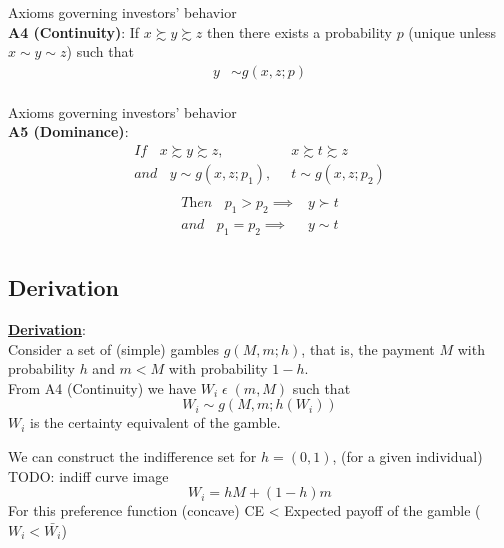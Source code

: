 \documentclass[
14pt,notheorems,hyperref={pdfauthor=whatever}
]{beamer}
\begin{document}
\begin{frame}
Axioms governing investors' behavior\\
\hfill \break
\textbf{A4 (Continuity)}: If $x \succsim y \succsim z$ then there exists a probability $p$ (unique unless $x \sim y \sim z$) such that\\
\hfill \break
\begin{align*}
    y &\sim g(x,z;p)\\
\end{align*}
\end{frame}

\begin{frame}
Axioms governing investors' behavior\\
\hfill \break
\textbf{A5 (Dominance)}:
\begin{align*}
    \textit{If }\;\;x \succsim y \succsim z,&\;\; x \succsim t \succsim z\\
    \textit{and }\;\;y \sim g(x,z;p_1),&\;\; t \sim g(x,z;p_2)\\
\end{align*}
\begin{align*}
    \textit{Then }\;\;p_1 > p_2 \implies& y \succ t\\
    \textit{and }\;\;p_1 = p_2 \implies& y \sim t\\
\end{align*}
\end{frame}

\subsection{Derivation}

\begin{frame}
\underline{\textbf{Derivation}}:\\
\hfill \break
Consider a set of (simple) gambles $g(M,m;h)$, that is, the payment $M$ with probability $h$ and $m<M$ with probability $1-h$.\\
From A4 (Continuity) we have $W_i\;\epsilon\;(m,M)$ such that\\
\[W_i \sim g(M,m;h(W_i))\]
\hfill \break
$W_i$ is the certainty equivalent of the gamble.
\end{frame}

\begin{frame}
We can construct the indifference set for $h=(0,1)$, (for a given individual)\\
TODO: indiff curve image\\
\[W_i = hM+(1-h)m\]
\hfill \break
For this preference function (concave) CE < Expected payoff of the gamble ($W_i<\bar{W_i}$)
\end{frame}
\end{document}
